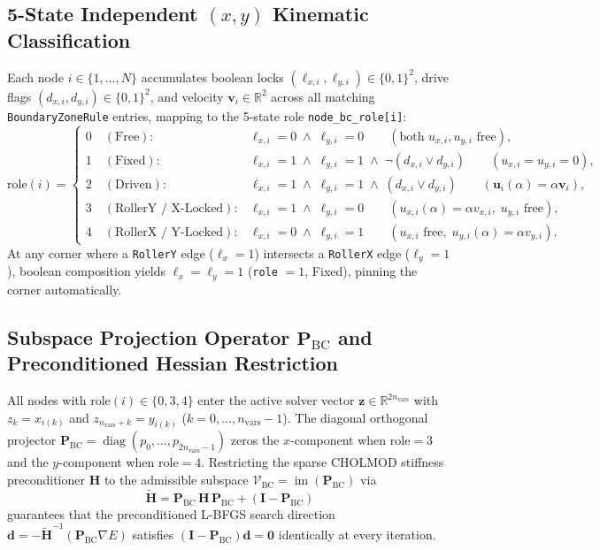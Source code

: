 \documentclass[11pt,a4paper]{article}
\newcommand{\R}{\mathbb{R}}
\newcommand{\code}[1]{\texttt{#1}}
\begin{document}
\subsection{5-State Independent $(x,y)$ Kinematic Classification}
Each node $i \in \{1,\dots,N\}$ accumulates boolean locks $(\ell_{x,i}, \ell_{y,i}) \in \{0,1\}^2$, drive flags $(d_{x,i}, d_{y,i}) \in \{0,1\}^2$, and velocity $\mathbf{v}_i \in \R^2$ across all matching \code{BoundaryZoneRule} entries, mapping to the 5-state role \code{node\_bc\_role[i]}:
\begin{equation}
  \text{role}(i) =
  \begin{cases}
    0 \quad (\text{Free}): & \ell_{x,i} = 0 \;\land\; \ell_{y,i} = 0 \qquad (\text{both } u_{x,i}, u_{y,i} \text{ free}), \\
    1 \quad (\text{Fixed}): & \ell_{x,i} = 1 \;\land\; \ell_{y,i} = 1 \;\land\; \neg(d_{x,i} \lor d_{y,i}) \qquad (u_{x,i} = u_{y,i} = 0), \\
    2 \quad (\text{Driven}): & \ell_{x,i} = 1 \;\land\; \ell_{y,i} = 1 \;\land\; (d_{x,i} \lor d_{y,i}) \qquad (\mathbf{u}_i(\alpha) = \alpha\mathbf{v}_i), \\
    3 \quad (\text{RollerY / X-Locked}): & \ell_{x,i} = 1 \;\land\; \ell_{y,i} = 0 \qquad (u_{x,i}(\alpha) = \alpha v_{x,i},\; u_{y,i} \text{ free}), \\
    4 \quad (\text{RollerX / Y-Locked}): & \ell_{x,i} = 0 \;\land\; \ell_{y,i} = 1 \qquad (u_{x,i} \text{ free},\; u_{y,i}(\alpha) = \alpha v_{y,i}).
  \end{cases}
\end{equation}
At any corner where a \code{RollerY} edge ($\ell_x=1$) intersects a \code{RollerX} edge ($\ell_y=1$), boolean composition yields $\ell_x=\ell_y=1$ (\code{role} $= 1$, Fixed), pinning the corner automatically.

\subsection{Subspace Projection Operator $\mathbf{P}_{\text{BC}}$ and Preconditioned Hessian Restriction}
All nodes with $\text{role}(i) \in \{0,3,4\}$ enter the active solver vector $\mathbf{z} \in \R^{2n_{\text{vars}}}$ with $z_k = x_{i(k)}$ and $z_{n_{\text{vars}}+k} = y_{i(k)}$ ($k = 0,\dots,n_{\text{vars}}-1$). The diagonal orthogonal projector $\mathbf{P}_{\text{BC}} = \operatorname{diag}(p_0, \dots, p_{2n_{\text{vars}}-1})$ zeros the $x$-component when $\text{role}=3$ and the $y$-component when $\text{role}=4$. Restricting the sparse CHOLMOD stiffness preconditioner $\mathbf{H}$ to the admissible subspace $\mathcal{V}_{\text{BC}} = \operatorname{im}(\mathbf{P}_{\text{BC}})$ via
\begin{equation}
  \tilde{\mathbf{H}} = \mathbf{P}_{\text{BC}}\,\mathbf{H}\,\mathbf{P}_{\text{BC}} + (\mathbf{I} - \mathbf{P}_{\text{BC}})
\end{equation}
guarantees that the preconditioned L-BFGS search direction $\mathbf{d} = -\tilde{\mathbf{H}}^{-1}(\mathbf{P}_{\text{BC}}\nabla E)$ satisfies $(\mathbf{I} - \mathbf{P}_{\text{BC}})\mathbf{d} = \mathbf{0}$ identically at every iteration.
\end{document}
